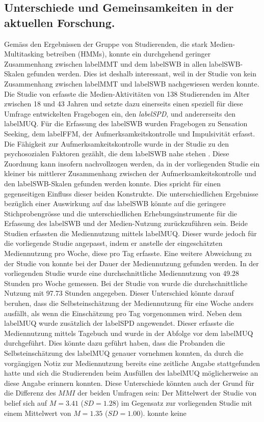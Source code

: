 \subsection{Unterschiede und Gemeinsamkeiten in der aktuellen Forschung.} Ge\-mäss den Ergebnissen der Gruppe von Studierenden, die stark Medien-Multitasking betreiben (HMMs), konnte ein durchgehend geringer Zusammenhang zwischen \gls{labelMMT} und dem \gls{labelSWB} in allen \gls{labelSWB}-Skalen gefunden werden. Dies ist deshalb interessant, weil in der Studie von  kein Zusammenhang zwischen \gls{labelMMT} und \gls{labelSWB} nachgewiesen werden konnte. Die Studie von \citeauthor{Shih2013} erfasste die Medien-Aktivitäten von 138 Studierenden im Alter zwischen 18 und 43 Jahren und setzte dazu einerseits einen speziell für diese Umfrage entwickelten Fragebogen ein, den \textit{\gls{labelSPD}}, und andererseits den \gls{labelMUQ}. Für die Erfassung des \gls{labelSWB} wurden Fragebogen zu Sensation Seeking, dem \gls{labelFFM}, der Aufmerksamkeitskontrolle und Impulsivität erfasst. Die Fähigkeit zur Aufmerksamkeitskontrolle wurde in der Studie zu den psychosozialen Faktoren gezählt, die dem \gls{labelSWB} nahe stehen \cite{Fergus2012}. Diese Zuordnung kann insofern nachvollzogen werden, da in der vorliegenden Studie ein kleiner bis mittlerer Zusammenhang zwischen der Aufmerksamkeitskontrolle und den \gls{labelSWB}-Skalen gefunden werden konnte. Dies spricht für einen gegenseitigen Einfluss dieser beiden Konstrukte. Die unterschiedlichen Ergebnisse bezüglich einer Auswirkung auf das \gls{labelSWB} könnte auf die geringere Stichprobengrösse und die unterschiedlichen Erhebungsinstrumente für die Erfassung des \gls{labelSWB} und der Medien-Nutzung zurückzuführen sein. Beide Studien erfassten die Mediennutzung mittels \gls{labelMUQ}. Dieser wurde jedoch für die vorliegende Studie angepasst, indem er anstelle der eingeschätzten Mediennutzung pro Woche, diese pro Tag erfasste. Eine weitere Abweichung zu der Studie von  konnte bei der Dauer der Mediennutzung gefunden werden. In der vorliegenden Studie wurde eine durchschnittliche Mediennutzung von 49.28 Stunden pro Woche gemessen. Bei der Studie von \citeauthor{Shih2013} wurde die durchschnittliche Nutzung mit 97.73 Stunden angegeben. Dieser Unterschied könnte darauf beruhen, dass die Selbsteinschätzung der Mediennutzung für eine Woche anders ausfällt, als wenn die Einschätzung pro Tag vorgenommen wird. Neben dem \gls{labelMUQ} wurde zusätzlich der \gls{labelSPD} angewendet. Dieser erfasste die Mediennutzung mittels Tagebuch und wurde in der Abfolge vor dem \gls{labelMUQ} durchgeführt. Dies könnte dazu geführt haben, dass die Probanden die Selbsteinschätzung des \gls{labelMUQ} genauer vornehmen konnten, da durch die vorgängigen Notiz zur Mediennutzung bereits eine zeitliche Angabe stattgefunden hatte und sich die Studierenden beim Ausfüllen des \gls{labelMUQ} möglicherweise an diese Angabe erinnern konnten. Diese Unterschiede könnten auch der Grund für die Differenz des $MMI$ der beiden Umfragen sein: Der Mittelwert der Studie von  belief sich auf $M=3.41$ ($SD=1.28$) im Gegensatz zur vorliegenden Studie mit einem Mittelwert von $M=1.35$ ($SD=1.00$). \citeauthor{Shih2013} konnte keine 